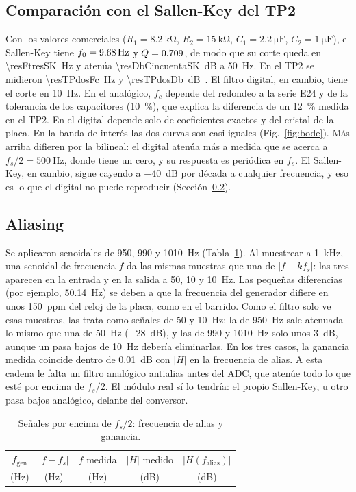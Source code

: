 \subsection{Comparación con el Sallen-Key del TP2}
Con los valores comerciales ($R_1 = \SI{8,2}{\kilo\ohm}$, $R_2 = \SI{15}{\kilo\ohm}$, $C_1 = \SI{2,2}{\micro\farad}$, $C_2 = \SI{1}{\micro\farad}$), el Sallen-Key tiene $f_0 = \SI{9,68}{\hertz}$ y $Q = \num{0,709}$, de modo que su corte queda en \SI{\resFtresSK}{\hertz} y atenúa \SI{\resDbCincuentaSK}{\dB} a \SI{50}{\hertz}. En el TP2 se midieron \SI{\resTPdosFc}{\hertz} y \SI{\resTPdosDb}{\dB}~\cite{tp2}. El filtro digital, en cambio, tiene el corte en \SI{10}{\hertz}. En el analógico, $f_c$ depende del redondeo a la serie E24 y de la tolerancia de los capacitores (\SI{10}{\percent}), que explica la diferencia de un \SI{12}{\percent} medida en el TP2. En el digital depende solo de coeficientes exactos y del cristal de la placa. En la banda de interés las dos curvas son casi iguales (Fig.~\ref{fig:bode}). Más arriba difieren por la bilineal: el digital atenúa más a medida que se acerca a $f_s/2 = \SI{500}{\hertz}$, donde tiene un cero, y su respuesta es periódica en $f_s$. El Sallen-Key, en cambio, sigue cayendo a \SI{-40}{\dB} por década a cualquier frecuencia, y eso es lo que el digital no puede reproducir (Sección~\ref{sec:aliasing}).

\subsection{Aliasing}
\label{sec:aliasing}
Se aplicaron senoidales de 950, 990 y \SI{1010}{\hertz} (Tabla~\ref{tab:aliasing}). Al muestrear a \SI{1}{\kilo\hertz}, una senoidal de frecuencia $f$ da las mismas muestras que una de $|f - k f_s|$: las tres aparecen en la entrada y en la salida a 50, 10 y \SI{10}{\hertz}. Las pequeñas diferencias (por ejemplo, \SI{50,14}{\hertz}) se deben a que la frecuencia del generador difiere en unos \SI{150}{ppm} del reloj de la placa, como en el barrido. Como el filtro solo ve esas muestras, las trata como señales de 50 y \SI{10}{\hertz}: la de \SI{950}{\hertz} sale atenuada lo mismo que una de \SI{50}{\hertz} (\SI{-28}{\dB}), y las de 990 y \SI{1010}{\hertz} solo unos \SI{3}{\dB}, aunque un pasa bajos de \SI{10}{\hertz} debería eliminarlas. En los tres casos, la ganancia medida coincide dentro de \SI{0,01}{\dB} con $|H|$ en la frecuencia de alias. A esta cadena le falta un filtro analógico antialias antes del ADC, que atenúe todo lo que esté por encima de $f_s/2$. El módulo real sí lo tendría: el propio Sallen-Key, u otro pasa bajos analógico, delante del conversor.

\begin{table}[!htb]
\centering
\caption{Señales por encima de $f_s/2$: frecuencia de alias y ganancia.}
\label{tab:aliasing}
\begin{tabular}{ccccc}
\toprule
$f_\mathrm{gen}$ & $|f - f_s|$ & $f$ medida & $|H|$ medido & $|H(f_\mathrm{alias})|$ \\
(Hz) & (Hz) & (Hz) & (dB) & (dB) \\
\midrule

\end{tabular}
\end{table}
